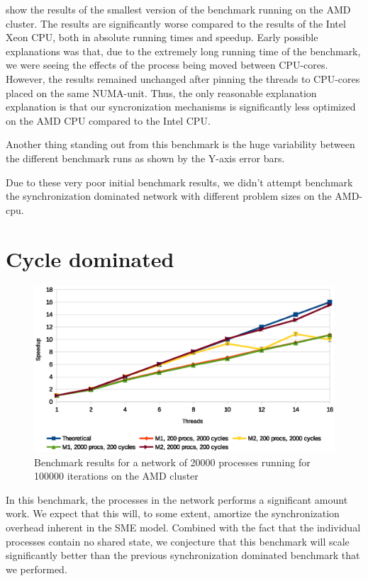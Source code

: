  show the results of the smallest version of the
benchmark running on the AMD cluster. The results are significantly
worse compared to the results of the Intel Xeon CPU, both in absolute
running times  and
speedup. Early possible explanations was that, due to the extremely
long running time of the benchmark, we were seeing the effects of the
process being moved between CPU-cores. However, the results remained
unchanged after pinning the threads to CPU-cores placed on the same
NUMA-unit. Thus, the only reasonable explanation explanation is that our
syncronization mechanisms is significantly less optimized on the AMD
CPU compared to the Intel CPU.

Another thing standing out from this benchmark is the huge variability
between the different benchmark runs as shown by the Y-axis error bars.

Due to these very poor initial benchmark results, we didn't attempt
benchmark the synchronization dominated network with different problem
sizes on the AMD-cpu.


\section{Cycle dominated}

\begin{figure}
\centering
\includegraphics[width=\textwidth]{graphs/heavy-ring2}
\caption[Synchronization-dominated benchmark on AMD cluster]{Benchmark results for a network of 20000 processes running
for 100000 iterations on the AMD cluster}
\label{fig:heavy-ring}
\end{figure}


In this benchmark, the processes in the network performs a significant
amount work. We expect that this will, to some extent, amortize the
synchronization overhead inherent in the SME model. Combined with the
fact that the individual processes contain no shared state, we
conjecture that this benchmark will scale significantly better
than the previous synchronization dominated benchmark that we
performed.

